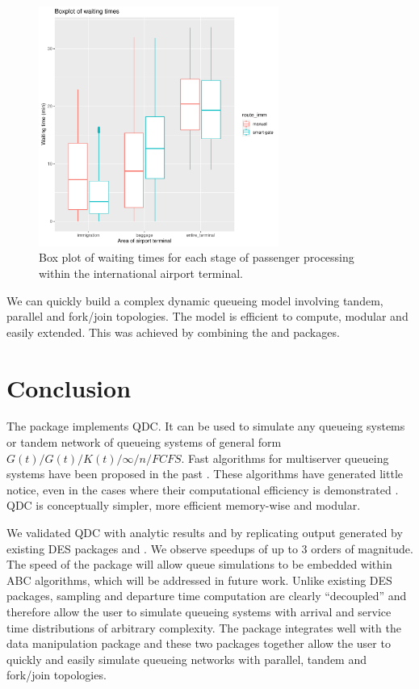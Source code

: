 \documentclass[article]{jss}
\begin{document}
\begin{figure}[t!]
\centering
\includegraphics[width = 0.7\textwidth, trim = 0 5 0 5, clip]{boxplot_dplyr.pdf}
\caption{Box plot of waiting times for each stage of passenger
  processing within the international airport terminal. }
\label{fig:boxplot_dplyr.pdf}
\end{figure}

We can quickly build a complex dynamic queueing model involving
tandem, parallel and fork/join topologies. The model is efficient to
compute, modular and easily extended. This was achieved by combining
the  and  packages.

\section{Conclusion}

The  package  implements QDC. It can be
used to simulate any queueing systems or tandem network of queueing
systems of general form $G(t)/G(t)/K(t)/\infty/n/\mathit{FCFS}$. Fast
algorithms for multiserver queueing systems have been proposed in the
past
\citep{krivulin_recursive_1994,sutton_inference_2010,kin_generalized_2010}. These
algorithms have generated little notice, even in the cases where their
computational efficiency is demonstrated
\citep{kin_generalized_2010}. QDC is conceptually simpler, more
efficient memory-wise and modular.

We validated QDC with analytic results and by replicating output
generated by existing DES packages  and . We
observe speedups of up to 3 orders of magnitude. The speed of the
package will allow queue simulations to be embedded within ABC
algorithms, which will be addressed in future work. Unlike existing
DES packages, sampling and departure time computation are clearly
``decoupled'' and therefore allow the user to simulate queueing systems
with arrival and service time distributions of arbitrary
complexity. The package integrates well with the data manipulation
package  and these two packages together allow the user to
quickly and easily simulate queueing networks with parallel, tandem
and fork/join topologies.
\end{document}
